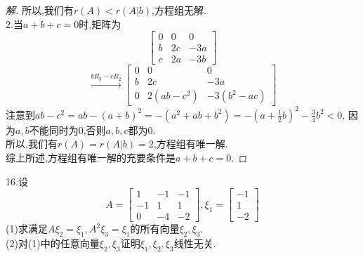 \documentclass[10pt,a4paper]{report}
\begin{document}
\begin{proof}[解]
	所以,我们有$r(A) < r(A|b)$,方程组无解.\\
	2.当$a+b+c = 0$时,矩阵为
	$$
	\left[
	\begin{matrix}
	0 & 0 & 0 \\
	b & 2c & -3a \\
	c & 2a & -3b 
	\end{matrix}
	\right]
	$$
	$$
	\xrightarrow{bR_{3}-cR_{2}}
	\left[
	\begin{matrix}
	0 & 0 & 0 \\
	b & 2c & -3a \\
	0 & 2(ab-c^{2}) & -3(b^{2}-ac)
	\end{matrix}
	\right]
	$$
	注意到$ab-c^{2} = ab-(a+b)^{2} = -(a^{2}+ab+b^{2}) = -(a+\frac{1}{2}b)^{2}-\frac{3}{4}b^{2} < 0$, 因为$a,b$不能同时为0,否则$a,b,c$都为0.\\
	所以,我们有$r(A) = r(A|b) = 2$,方程组有唯一解.\\
	综上所述,方程组有唯一解的充要条件是$a+b+c = 0$.
\end{proof}
\noindent 16.设
$$
A=\left[
\begin{matrix}
1 & -1 & -1 \\
-1 & 1 & 1 \\
0 & -4 & -2
\end{matrix}
\right],\xi_{1} = \left[
\begin{matrix}
-1 \\
1 \\
-2
\end{matrix}
\right]
$$
(1)求满足$A\xi_{2}=\xi_{1},A^{2}\xi_{3}=\xi_{1}$的所有向量$\xi_{2},\xi_{3}$.\\
(2)对(1)中的任意向量$\xi_{2},\xi_{3}$证明$\xi_{1},\xi_{2},\xi_{3}$线性无关.
\end{document}
